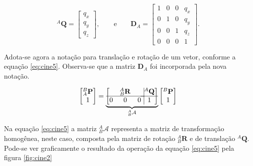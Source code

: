     \begin{equation}\label{eq:cine4}
    {}^A\mathbf{Q} =
    \begin{bmatrix}
    q_x\\ q_y \\ q_z
    \end{bmatrix}, \qquad \mathrm{e} \qquad
    \mathbf{D}_A = 
    \begin{bmatrix}
    1 & 0 & 0 & q_x\\
    0 & 1 & 0 & q_y\\
    0 & 0 & 1 & q_z\\
    0 & 0 & 0 & 1
    \end{bmatrix}.
    \end{equation}
    
    Adota-se agora a notação para translação e rotação de um vetor, conforme a equação \eqref{eq:cine5}. Observa-se que a matriz $\mathbf{D}_A$ foi incorporada pela nova notação.
    
    \begin{equation}\label{eq:cine5}
    \begin{bmatrix}
    {}^B_A\mathbf{P}\\ 1
    \end{bmatrix}
    =
    \underbrace {
    \left[
    \begin{matrix}
    & {}_B^A\mathbf{R}& \\ \hline
    0 & 0 & 0\\
    \end{matrix} \right.
    \left.
    \vline
    \begin{matrix}
    {}^A\mathbf{Q}\\ \hline
    1
    \end{matrix} \right]
    }_{{}^A_B\mathcal{A}}
    \begin{bmatrix}
    {}^B\mathbf{P}\\
    1
    \end{bmatrix}
    \end{equation}
    
    
    Na equação \eqref{eq:cine5} a matriz ${}^A_B\mathcal{A}$ representa a matriz de transformação homogênea, neste caso, composta pela matriz de rotação ${}^A_B \mathbf{R}$ e de translação ${}^A\mathbf{Q}$. Pode-se ver graficamente o resultado da operação da equação \eqref{eq:cine5} pela figura \ref{fig:cine2}
    

